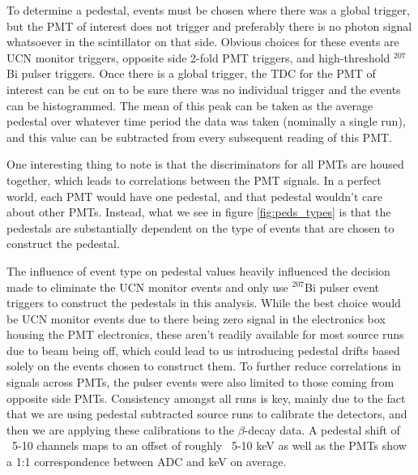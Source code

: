 To determine a pedestal, events must be chosen where there was a global trigger, but
the PMT of interest does not trigger and preferably there is no photon signal
whatsoever in the scintillator on that side. Obvious choices for these events are
UCN monitor triggers, opposite side 2-fold PMT triggers, and high-threshold $^{207}$Bi
pulser triggers. Once there is a global trigger, the TDC for the PMT of interest can 
be cut on to be sure there was no individual trigger and the events can be 
histogrammed. The mean of this peak can be taken as the average pedestal over whatever
time period the data was taken (nominally a single run), and this value can be 
subtracted from every subsequent reading of this PMT.

One interesting thing to note is that the discriminators for all PMTs are housed 
together, which leads to correlations between the PMT signals. In a perfect world, 
each PMT would have one pedestal, and that pedestal wouldn't care about other PMTs.
Instead, what we see in figure \ref{fig:peds_types} is that the pedestals
are substantially dependent on the type of events that are chosen 
to construct the pedestal. 

The influence of event type on pedestal values heavily influenced the decision made
to eliminate the UCN monitor events and only use $^{207}$Bi pulser event 
triggers to construct the pedestals in this analysis. While the best 
choice would be UCN monitor events due to there being zero signal 
in the electronics box housing the PMT electronics, these aren't readily 
available for most source runs due to beam being off, which could lead to 
us introducing pedestal drifts based solely on the events chosen to 
construct them. To further reduce correlations in signals across PMTs, the pulser
events were also limited to those coming from opposite side PMTs.
Consistency amongst all runs 
is key, mainly due to the fact that we are using pedestal subtracted source runs
to calibrate the detectors, and then we are applying these calibrations to the 
$\beta$-decay data. A pedestal shift of ~5-10 channels maps to an offset of roughly
~5-10 keV as well as the PMTs show a 1:1 correspondence between ADC and keV on 
average. 

